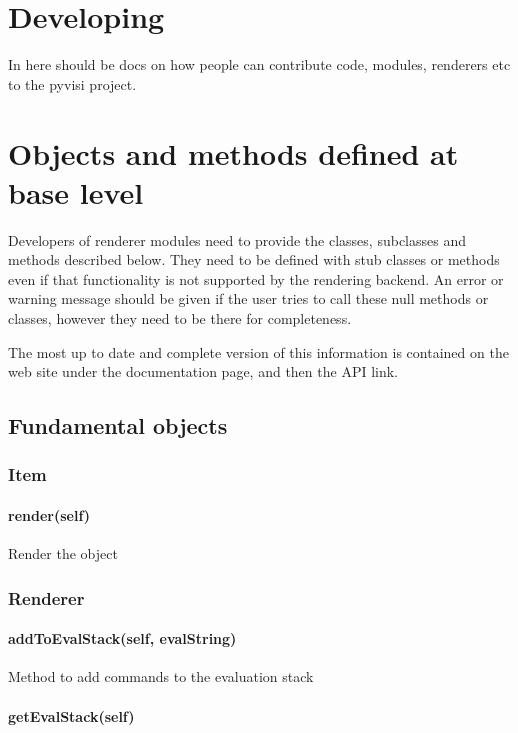 
\chapter{Developing \pyvisi}
\label{chap:developingPyvisi}

In here should be docs on how people can contribute code, modules, renderers
etc to the pyvisi project.

\chapter{Objects and methods defined at base level}

Developers of \pyvisi renderer modules need to provide the classes, subclasses
and methods described below.  They need to be defined with stub classes or
methods even if that functionality is not supported by the rendering backend.
An error or warning message should be given if the user tries to call these
null methods or classes, however they need to be there for completeness.

The most up to date and complete version of this information is contained on
the \pyvisi web site under the documentation page, and then the API link.

\section{Fundamental objects}

\subsection{Item}

\subsubsection{render(self)}

Render the object

\subsection{Renderer}

\subsubsection{addToEvalStack(self, evalString)}

Method to add commands to the evaluation stack

\subsubsection{getEvalStack(self)}


